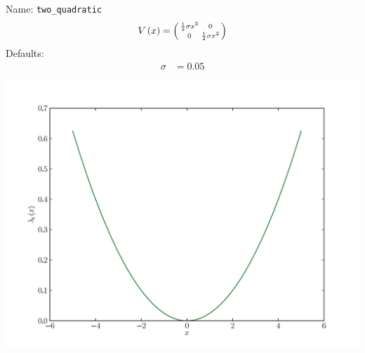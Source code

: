 \documentclass[a4paper,10pt]{report}
\begin{document}
\begin{minipage}{0.5\linewidth}
  Name:    \texttt{two\_quadratic}
  \begin{equation*}
    V\left( x \right) = \left(\begin{smallmatrix}\frac{1}{2} \sigma x^{2} & 0\\0 & \frac{1}{2} \sigma x^{2}\end{smallmatrix}\right)
  \end{equation*}
  Defaults:
  \begin{align*}
    \sigma & = 0.05
  \end{align*}
\end{minipage}
\begin{minipage}{0.5\linewidth}
  \begin{center}
    \includegraphics[scale=0.25]{./fig/two_quadratic.pdf}
  \end{center}
\end{minipage}
\end{document}
